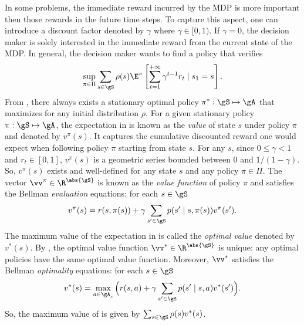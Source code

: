 In some problems, the immediate reward incurred by the MDP is more important then those rewards in the future time steps.
To capture this aspect, one can introduce a discount factor denoted by $\gamma$ where $\gamma\in[0,1)$.
If $\gamma=0$, the decision maker is solely interested in the immediate reward from the current state of the MDP.
In general, the decision maker wants to find a policy that verifies
\begin{equation}
    \label{eq:discount_obj}
    \sup_{\pi\in\Pi}\sum_{s\in\gS}\rho(s)\E^\pi\left[\sum_{t=1}^{+\infty} \gamma^{t-1}r_t \mid s_1=s\right].
\end{equation}
From \cite[Chapter~6]{puterman2014markov}, there always exists a stationary optimal policy $\pi^*:\gS\mapsto\gA$ that maximizes  for any initial distribution $\rho$.
For a given stationary policy $\pi:\gS\mapsto\gA$, the expectation in  is known as the \emph{value} of state $s$ under policy $\pi$ and denoted by $v^\pi(s)$.
It captures the cumulative discounted reward one would expect when following policy $\pi$ starting from state $s$.
For any $s$, since $0\le\gamma<1$ and $r_t\in[0,1]$, $v^\pi(s)$ is a geometric series bounded between $0$ and $1/(1-\gamma)$.
So, $v^\pi(s)$ exists and well-defined for any state $s$ and any policy $\pi\in\Pi$.
The vector $\vv^\pi\in\R^{\abs{\gS}}$ is known as the \emph{value function} of policy $\pi$ and satisfies the Bellman \emph{evaluation} equations: for each $s\in\gS$
\begin{equation}
    \label{eq:discount_be_eval}
    v^\pi(s) =r(s,\pi(s)) +\gamma\sum_{s'\in\gS}p(s'\mid s,\pi(s))v^\pi(s').
\end{equation}
The maximum value of the expectation in  is called the \emph{optimal value} denoted by $v^*(s)$.
By \cite[Theorem~6.2.5]{puterman2014markov}, the optimal value function $\vv^*\in\R^{\abs{\gS}}$ is unique: any optimal policies have the same optimal value function.
Moreover, $\vv^*$ satisfies the Bellman \emph{optimality} equations: for each $s\in\gS$
\begin{equation}
    \label{eq:discount_be_opt}
     v^*(s)= \max_{a\in\gA_s}\Big(r(s, a) +\gamma\sum_{s'\in\gS}p(s'\mid s,a)v^*(s')\Big).
\end{equation}
So, the maximum value of  is given by $\sum_{s\in\gS}\rho(s)v^*(s)$.

